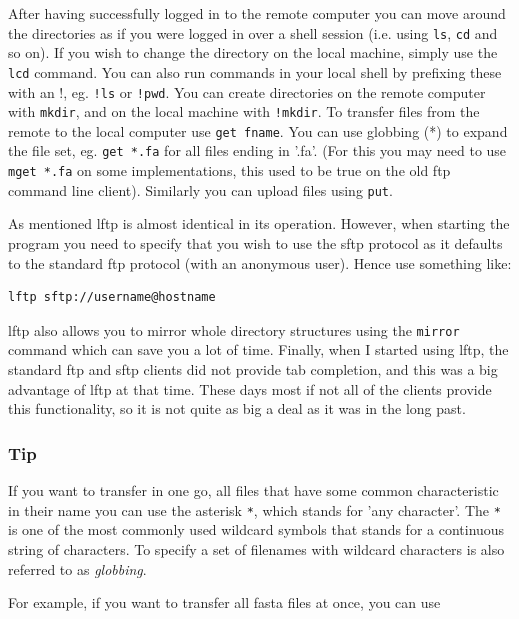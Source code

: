 \documentclass[11pt]{article}
\begin{document}
After having successfully logged in to the remote computer you can move
around the directories as if you were logged in over a shell session
(i.e. using \texttt{ls}, \texttt{cd} and so on). If you wish to change the directory
on the local machine, simply use the \texttt{lcd} command. You can also run
commands in your local shell by prefixing these with an !, eg. \texttt{!ls} or
\texttt{!pwd}. You can create directories on the remote computer with \texttt{mkdir},
and on the local machine with \texttt{!mkdir}. To transfer files from the
remote to the local computer use \texttt{get fname}. You can use globbing (*)
to expand the file set, eg. \texttt{get *.fa} for all files ending in '.fa'.
(For this you may need to use \texttt{mget *.fa} on some implementations, this
used to be true on the old ftp command line client). Similarly you can
upload files using \texttt{put}.

As mentioned lftp is almost identical in its operation. However, when
starting the program you need to specify that you wish to use the sftp
protocol as it defaults to the standard ftp protocol (with an anonymous
user). Hence use something like:

\begin{verbatim}
lftp sftp://username@hostname
\end{verbatim}

lftp also allows you to mirror whole directory structures using the
\texttt{mirror} command which can save you a lot of time. Finally, when I
started using lftp, the standard ftp and sftp clients did not provide
tab completion, and this was a big advantage of lftp at that time. These
days most if not all of the clients provide this functionality, so it is
not quite as big a deal as it was in the long past.


\subsubsection{Tip}
\label{sec-2-2-3}

If you want to transfer in one go, all files that have some common
characteristic in their name you can use the asterisk \texttt{*}, which
stands for 'any character'. The \texttt{*} is one of the most commonly used
wildcard symbols that stands for a continuous string of characters. To
specify a set of filenames with wildcard characters is also referred
to as \emph{globbing}.

For example, if you want to transfer all
fasta files at once, you can use
\end{document}
